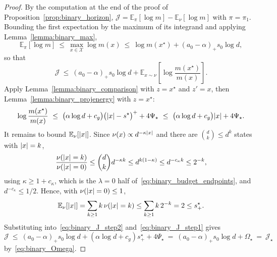 \documentclass[aos]{imsart}%
\DeclarePairedDelimiter{\abs}{\lvert}{\rvert}
\newcommand{\ambientspace}[0]{\mathcal{X}}
\newcommand{\bbE}[0]{\mathbb{E}}
\theoremstyle{plain}
\theoremstyle{definition}
\begin{document}
    \begin{proof}
        By the computation at the end of the proof of
        Proposition~\ref{prop:binary_horizon},
        $\mathcal{J}=\bbE_{\pi}[\log m]-\bbE_{\nu}[\log m]$ with $\pi=\pi_1$.
        Bounding the first expectation by the maximum of its integrand and
        applying Lemma~\ref{lemma:binary_max},
        \begin{equation}
            \label{eq:binary_J_step0}
            \bbE_{\pi}[\log m]\ \leq\ \max_{x\in\ambientspace}\log m(x)
            \ \leq\ \log m(x^{\star})+(a_0-\alpha)_{+}s_0\log d ,
        \end{equation}
        so that
        \begin{equation}
            \label{eq:binary_J_step1}
            \mathcal{J}\ \leq\ (a_0-\alpha)_{+}s_0\log d
            +\bbE_{x\sim\nu}
            \left[\log\frac{m(x^{\star})}{m(x)}\right].
        \end{equation}
        Apply Lemma~\ref{lemma:binary_comparison} with $z=x^{\star}$ and
        $z'=x$, then Lemma~\ref{lemma:binary_projenergy} with
        $z=x^{\star}$:
        \begin{equation}
            \label{eq:binary_J_step2}
            \log\frac{m(x^{\star})}{m(x)}
            \ \leq\ \bigl(\alpha\log d+c_g\bigr)
            \bigl(\abs{x}-s^{\star}\bigr)^{+}+4\Psi_\star
            \ \leq\ \bigl(\alpha\log d+c_g\bigr)\abs{x}+4\Psi_\star .
        \end{equation}
        It remains to bound $\bbE_\nu[\abs x]$. Since
        $\nu(x)\propto d^{-\kappa\abs x}$ and there are $\binom dk\leq d^{k}$
        states with $\abs x=k$,
        \begin{equation*}
            \frac{\nu(\abs x=k)}{\nu(\abs x=0)}
            \leq\binom dk d^{-\kappa k}\leq d^{k(1-\kappa)}
            \leq d^{-c_\kappa k}\leq2^{-k},
        \end{equation*}
        using $\kappa\geq1+c_\kappa$, which is the $\lambda=0$ half
        of~\eqref{eq:binary_budget_endpoints}, and $d^{-c_\kappa}\leq1/2$.
        Hence, with
        $\nu(\abs x=0)\leq1$,
        \begin{equation}
            \label{eq:binary_Enu_size}
            \bbE_\nu[\abs x]=\sum_{k\geq1}k\,\nu(\abs x=k)
            \leq\sum_{k\geq1}k\,2^{-k}=2\leq s^\star_+ .
        \end{equation}
        Substituting into~\eqref{eq:binary_J_step2}
        and~\eqref{eq:binary_J_step1} gives
        \begin{equation*}
            \mathcal J\ \leq\ (a_0-\alpha)_{+}s_0\log d
            +(\alpha\log d+c_g)s^\star_++4\Psi_\star
            \ =\ (a_0-\alpha)_{+}s_0\log d+\Omega_\star
            \ =\ \mathcal{J}_\star
        \end{equation*}
        by~\eqref{eq:binary_Omega}.
    \end{proof}
\end{document}
